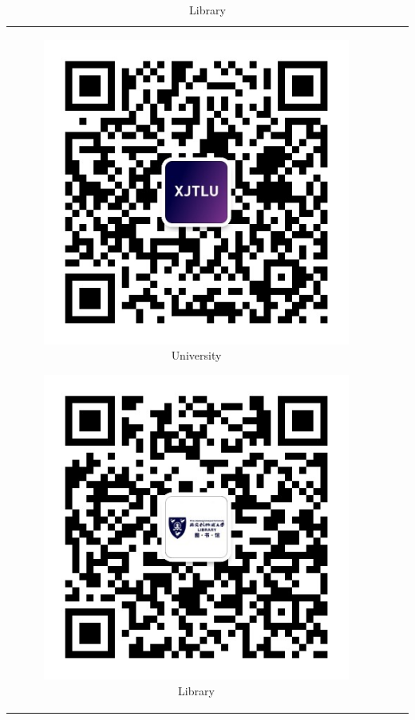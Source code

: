 \begin{table}[H]
    \begin{tabular}{ccc}
        \begin{subfigure}{0.25\columnwidth}
            \includegraphics[width=\linewidth]{author-folder/Kai.Wu/qrcode_XJTLU-China_1.jpg} \caption{University}
        \end{subfigure} \hfill
        \begin{subfigure}{0.25\columnwidth}
            \includegraphics[width=\linewidth]{author-folder/Kai.Wu/qrcode_XJTLU_library_1.jpg} \caption{Library}

\end{subfigure}
\end{tabular}
\end{table}
